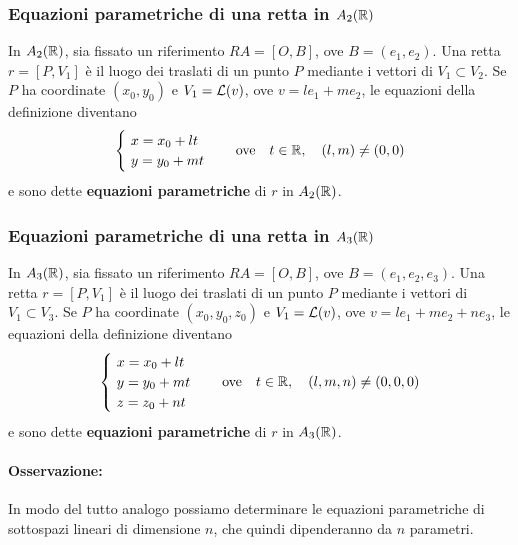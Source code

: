 \documentclass[twoside]{report}
\begin{document}
\subsubsection{Equazioni parametriche di una retta in \(A_2(\RR )\)} 
In \(A_2(\RR )\), sia fissato un riferimento \(RA = [O, B]\), ove \(B = (e_1, e_2)\). Una retta \(r = [P, V_1]\) è il luogo dei traslati di un punto \(P\) mediante i vettori di \(V_1 \subset V_2\). Se \(P\) ha coordinate \((x_0, y_0)\) e \(V_1 = \mathcal{L}(v) \), ove \(v = le_1 + me_2\), le equazioni della definizione diventano \[
\begin{cases}
    \ x = x_0 + lt \\
    \ y = y_0 + mt \\
\end{cases}
\quad \text{ove}\quad t \in \RR , \quad (l,m) \neq (0,0)\] 
e sono dette \textbf{equazioni parametriche} di \(r\) in \(A_2(\RR )\).

\subsubsection{Equazioni parametriche di una retta in \(A_3(\RR )\)}
In \(A_3(\RR )\), sia fissato un riferimento \(RA = [O, B]\), ove \(B = (e_1, e_2, e_3)\). Una retta \(r = [P, V_1]\) è il luogo dei traslati di un punto \(P\) mediante i vettori di \(V_1 \subset V_3\). Se \(P\) ha coordinate \((x_0, y_0, z_0)\) e \(V_1 = \mathcal{L}(v) \), ove \(v = le_1 + me_2 + ne_3\), le equazioni della definizione diventano \[
\begin{cases}
    \ x = x_0 + lt \\
    \ y = y_0 + mt \\
    \ z = z_0 + nt \\
\end{cases}
\quad \text{ove}\quad t \in \RR , \quad (l,m,n) \neq (0,0,0)\] 
e sono dette \textbf{equazioni parametriche} di \(r\) in \(A_3(\RR )\).

\paragraph{Osservazione:} In modo del tutto analogo possiamo determinare le equazioni parametriche di sottospazi lineari di dimensione \(n\), che quindi dipenderanno da \(n\) parametri.
\end{document}
